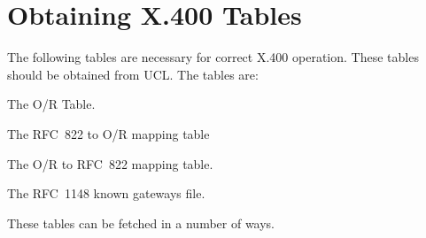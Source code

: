 \chapter{Obtaining X.400 Tables}\label{app:tables}

The following tables are necessary for correct X.400 operation. These
tables should be obtained from UCL. The tables are:
\begin{describe}
\item[\verb|or|:] The O/R Table.
\item[\verb|rfc2or|:] The RFC~822 to O/R mapping table
\item[\verb|or2rfc|:] The O/R to RFC~822 mapping table.
\item[\verb|rfc1148gate|:] The RFC~1148 known gateways file.
\end{describe}

These tables can be fetched in a number of ways.

